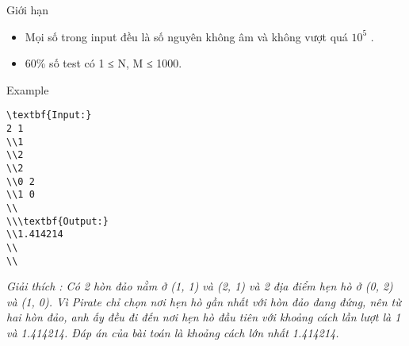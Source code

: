 Giới hạn
\begin{itemize}
	\item     Mọi số trong input đều là số nguyên không âm và không vượt quá $10^{5}$    .   
	\item     60\% số test có 1 ≤ N, M ≤ 1000.   
\end{itemize}
Example
\begin{verbatim}
\textbf{Input:}
2 1 
\\1 
\\2
\\2
\\0 2
\\1 0
\\
\\\textbf{Output:}
\\1.414214
\\
\\\end{verbatim}



\emph{     Giải thích        : Có 2 hòn đảo nằm ở (1, 1) và (2, 1) và 2 địa điểm hẹn hò ở (0, 2) và (1, 0). Vì Pirate chỉ chọn nơi hẹn hò gần nhất với hòn đảo đang đứng, nên từ hai hòn đảo, anh ấy đều đi đến nơi hẹn hò đầu tiên với khoảng cách lần lượt là 1 và 1.414214. Đáp án của bài toán là khoảng cách lớn nhất 1.414214.    
\\}